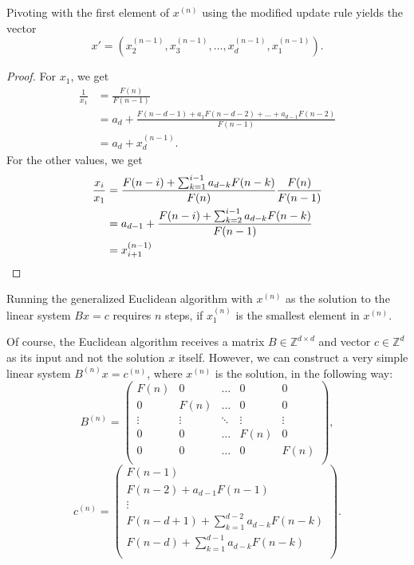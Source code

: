 \documentclass[english,version-2020-11]{uzl-thesis}
\newcommand\Z{{\mathbb Z}}
\begin{document}
\begin{lemma}
  Pivoting with the first element of $x^{(n)}$ using the modified update rule yields the vector
  \[
    x' = (x^{(n-1)}_2, x^{(n-1)}_3, \dots, x^{(n-1)}_d, x^{(n-1)}_1).
  \]
\end{lemma}

\begin{proof}
  For $x_1$, we get
  \[
    \begin{aligned}
      \frac{1}{x_1}
      & = \frac{F(n)}{F(n - 1)} \\
      & = a_d + \frac{F(n - d - 1) + a_1 F(n - d - 2) + \dots + a_{d-1} F(n - 2)}{F(n - 1)} \\
      & = a_d + x^{(n-1)}_d.
    \end{aligned}
  \]
  For the other values, we get
  \begin{align*}
    \frac{x_i}{x_1}
    & = \frac{F(n - i) + \sum_{k=1}^{i-1} a_{d-k} F(n - k)}{F(n)} \frac{F(n)}{F(n - 1)} \\
    & = a_{d-1} + \frac{F(n - i) + \sum_{k=2}^{i-1} a_{d-k} F(n - k)}{F(n-1)} \\
    & = x^{(n-1)}_{i+1} \qedhere
  \end{align*}
\end{proof}

\begin{corollary}
  Running the generalized Euclidean algorithm with $x^{(n)}$ as the solution to
  the linear system $B x = c$ requires $n$ steps, if $x^{(n)}_1$ is the
  smallest element in $x^{(n)}$.
\end{corollary}

Of course, the Euclidean algorithm receives a matrix $B \in \Z^{d \times d}$
and vector $c \in \Z^d$ as its input and not the solution $x$ itself.
However, we can construct a very simple linear system $B^{(n)} x = c^{(n)}$,
where $x^{(n)}$ is the solution, in the following way:
\[
  B^{(n)} =
  \begin{pmatrix}
    F(n) & 0 & \dots & 0 & 0 \\
    0 & F(n) & \dots & 0 & 0 \\
    \vdots & \vdots & \ddots & \vdots & \vdots \\
    0 & 0 & \dots & F(n) & 0 \\
    0 & 0 & \dots & 0 & F(n) \\
  \end{pmatrix},
\]
\[
  c^{(n)} =
  \begin{pmatrix}
    F(n - 1) \\
    F(n - 2) + a_{d-1} F(n - 1) \\
    \vdots \\
    F(n - d + 1) + \sum_{k=1}^{d-2} a_{d-k} F(n - k) \\
    F(n - d) + \sum_{k=1}^{d-1} a_{d-k} F(n - k) \\
  \end{pmatrix}.
\]
\end{document}
